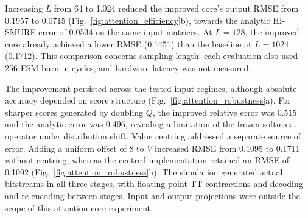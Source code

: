 Increasing $L$ from 64 to 1,024 reduced the improved core's output RMSE from
0.1957 to 0.0715 (Fig.~\ref{fig:attention_efficiency}b), towards the
analytic HI-SMURF error of 0.0534 on the same input matrices.
At $L=128$, the improved core already achieved a lower RMSE
(0.1451) than the baseline at $L=1024$ (0.1712).
This comparison concerns sampling length: each evaluation also used 256
FSM burn-in cycles, and hardware latency was not measured.

The improvement persisted across the tested input regimes, although absolute
accuracy depended on score structure (Fig.~\ref{fig:attention_robustness}a).
For sharper scores generated by doubling $Q$, the improved relative error
was 0.515 and the analytic error was 0.496, revealing a
limitation of the frozen softmax operator under distribution shift.
Value centring addressed a separate source of error. Adding a uniform offset
of 8 to $V$ increased RMSE from 0.1095 to 0.1711 without centring,
whereas the centred implementation retained an RMSE of 0.1092
(Fig.~\ref{fig:attention_robustness}b). The simulation generated actual
bitstreams in all three stages, with floating-point TT contractions and
decoding and re-encoding between stages. Input and output projections were
outside the scope of this attention-core experiment.
